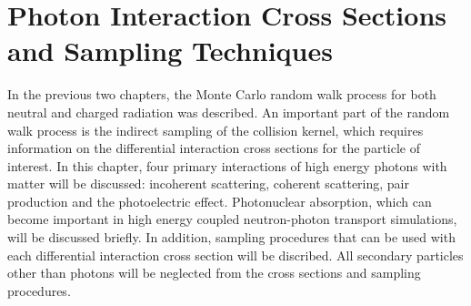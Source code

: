 \chapter{Photon Interaction Cross Sections and Sampling Techniques}
\label{ch:photon_interactions}
In the previous two chapters, the Monte Carlo random walk process for both
neutral and charged radiation was described. An important part of the random
walk process is the indirect sampling of the collision kernel, which requires
information on the differential interaction cross sections for the particle
of interest. In this chapter, four primary interactions of high energy photons 
with matter will be discussed: incoherent scattering, coherent scattering, 
pair production and the photoelectric effect. Photonuclear absorption, which can
become important in high energy coupled neutron-photon transport simulations, 
will be discussed briefly. In addition, sampling procedures that can be used 
with each differential interaction cross section will be discribed. All 
secondary particles other than photons will be neglected from the cross sections
and sampling procedures. 

